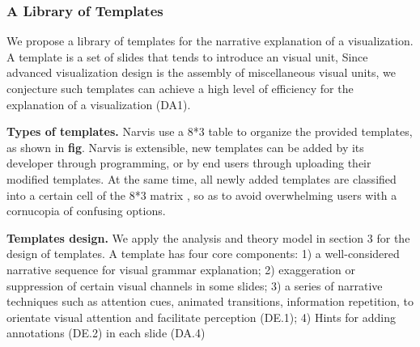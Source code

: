 \subsubsection{A Library of Templates}
We propose a library of templates for the narrative explanation of a visualization. A template is a set of slides that tends to introduce an visual unit,  Since advanced visualization design is the assembly of miscellaneous visual units, we conjecture  such templates can achieve a high level of efficiency for the explanation of a visualization (DA1). 

\textbf{Types of templates.}
Narvis use a 8*3  table to organize the provided templates, as shown in \textbf{fig}. Narvis is extensible, new templates can be added by its developer through programming, or by end users through uploading their modified templates. At the same time, all newly added templates are classified into a certain cell of the 8*3 matrix , so as to avoid overwhelming users with a cornucopia of confusing options.

\textbf{Templates design.}
We apply the analysis and theory model in section 3  for the design of templates. A template has four core components: 1) a well-considered narrative sequence for visual grammar explanation; 2) exaggeration or suppression of certain visual channels in some slides; 3) a series of narrative techniques such as attention cues, animated transitions, information repetition, to orientate visual attention and facilitate perception (DE.1); 4) Hints for adding annotations (DE.2) in each slide (DA.4) 


